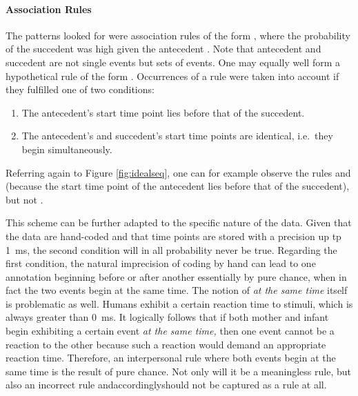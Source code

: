 \paragraph{Association Rules}
The patterns \citet{rohlfing18} looked for were association rules of the form , where the probability of the succedent  was high given the antecedent . Note that antecedent and succedent are not single events but sets of events. One may equally well form a hypothetical rule of the form . Occurrences of a rule were taken into account if they fulfilled one of two conditions:

\begin{enumerate}
	\item The antecedent's start time point lies before that of the succedent.
	\item The antecedent's and succedent's start time points are identical, i.e.\ they begin simultaneously.
\end{enumerate}

Referring again to Figure \ref{fig:idealseq}, one can for example observe the rules  and  (because the start time point of the antecedent lies before that of the succedent), but not .

This scheme can be further adapted to the specific nature of the data. Given that the data are hand-coded and that time points are stored with a precision up tp 1~ms, the second condition will in all probability never be true. Regarding the first condition, the natural imprecision of coding by hand can lead to one annotation beginning before or after another essentially by pure chance, when in fact the two events begin at the same time. The notion of \emph{at the same time} itself is problematic as well. Humans exhibit a certain reaction time to stimuli, which is always greater than 0~ms. It logically follows that if both mother and infant begin exhibiting a certain event \emph{at the same time,} then one event cannot be a reaction to the other because such a reaction would demand an appropriate reaction time. Therefore, an interpersonal rule where both events begin at the same time is the result of pure chance. Not only will it be a meaningless rule, but also an incorrect rule and\dash accordingly\dash should not be captured as a rule at all.

